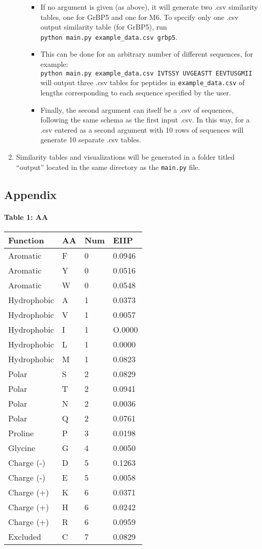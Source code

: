 \begin{enumerate}
\begin{itemize}
    \begin{itemize}
    \item
      If no argument is given (as above), it will generate two .csv
      similarity tables, one for GrBP5 and one for M6. To specify only
      one .csv output similarity table (for GrBP5), run
      \texttt{python\ main.py\ example\_data.csv\ grbp5}.
    \item
      This can be done for an arbitrary number of different sequences,
      for example:
      \texttt{python\ main.py\ example\_data.csv\ IVTSSY\ UVGEASTT\ EEVTUSGMII}
      will output three .csv tables for peptides in
      \texttt{example\_data.csv} of lengths corresponding to each
      sequence specified by the user.
    \item
      Finally, the second argument can itself be a .csv of sequences,
      following the same schema as the first input .csv. In this way,
      for a .csv entered as a second argument with 10 rows of sequences
      will generate 10 separate .csv tables.
    \end{itemize}
  \end{itemize}
\item
  Similarity tables and visualizations will be generated in a folder
  titled ``output'' located in the same directory as the
  \texttt{main.py} file.
\end{enumerate}

\hypertarget{appendix}{%
\subsection{Appendix}\label{appendix}}

\hypertarget{table-1-aa}{%
\paragraph{Table 1: AA}\label{table-1-aa}}

\begin{longtable}[]{@{}llll@{}}
\toprule
Function & AA & Num & EIIP\tabularnewline
\midrule
\endhead
Aromatic & F & 0 & 0.0946\tabularnewline
Aromatic & Y & 0 & 0.0516\tabularnewline
Aromatic & W & 0 & 0.0548\tabularnewline
Hydrophobic & A & 1 & 0.0373\tabularnewline
Hydrophobic & V & 1 & 0.0057\tabularnewline
Hydrophobic & I & 1 & O.0000\tabularnewline
Hydrophobic & L & 1 & 0.0000\tabularnewline
Hydrophobic & M & 1 & 0.0823\tabularnewline
Polar & S & 2 & 0.0829\tabularnewline
Polar & T & 2 & 0.0941\tabularnewline
Polar & N & 2 & 0.0036\tabularnewline
Polar & Q & 2 & 0.0761\tabularnewline
Proline & P & 3 & 0.0198\tabularnewline
Glycine & G & 4 & 0.0050\tabularnewline
Charge (-) & D & 5 & 0.1263\tabularnewline
Charge (-) & E & 5 & 0.0058\tabularnewline
Charge (+) & K & 6 & 0.0371\tabularnewline
Charge (+) & H & 6 & 0.0242\tabularnewline
Charge (+) & R & 6 & 0.0959\tabularnewline
Excluded & C & 7 & 0.0829\tabularnewline
\bottomrule
\end{longtable}

